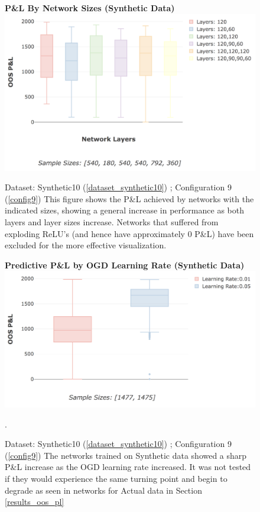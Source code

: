 \documentclass[a4paper,11pt,oneside]{article}
\theoremstyle{plain}
\theoremstyle{definition}
\begin{document}
	\begin{figure}[H]
		\centering 
		\textbf{P\&L By Network Sizes (Synthetic Data)}
		\includegraphics[scale=0.4]{images/results/8_appendix/synth_pl_box.png} 
		\caption[P\&L By Network Sizes (Synthetic Data)]{Dataset: Synthetic10 (\ref{dataset_synthetic10}) ; Configuration 9 (\ref{config9})
			\newline This figure shows the P\&L achieved by networks with the indicated sizes, showing a general increase in performance as both layers and layer sizes increase. Networks that suffered from exploding ReLU's (and hence have approximately 0 P\&L) have been excluded for the more effective visualization. }
		\label{figure-results_synth_pl_box}
	\end{figure}
	
	\begin{figure}[H]
		\centering 
		\textbf{Predictive P\&L by OGD Learning Rate (Synthetic Data)}
		\includegraphics[scale=0.4]{images/results/8_appendix/synth_ogd_lr.png} 
		\caption[Predictive P\&L by OGD Learning Rate (Synthetic Data)]{Dataset: Synthetic10 (\ref{dataset_synthetic10}) ;  Configuration 9 (\ref{config9}) 
			\newline The networks trained on Synthetic data showed a sharp P\&L increase as the OGD learning rate increased. It was not tested if they would experience the same turning point and begin to degrade as seen in networks for Actual data in Section \ref{results_oos_pl}}.
		\label{figure-synth_ogd_lr}
	\end{figure}
	
\end{document}
